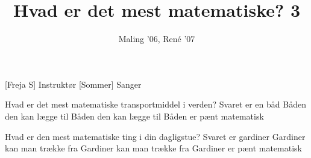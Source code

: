\documentclass[a4paper,11pt]{article}
\title{Hvad er det mest matematiske? 3}
\author{Maling '06, René '07}
\begin{document}
\maketitle

\begin{roles}
[Freja S] Instruktør
[Sommer] Sanger
\end{roles}

\begin{song}
 Hvad er det mest matematiske transportmiddel i verden?
Svaret er en båd
Båden den kan lægge til
Båden den kan lægge til
Båden er pænt matematisk

 Hvad er den mest matematiske ting i din dagligstue?
Svaret er gardiner
Gardiner kan man trække fra
Gardiner kan man trække fra
Gardiner er pænt matematisk
\end{song}
\end{document}
